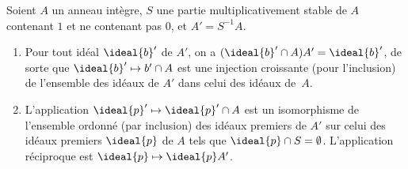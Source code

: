 \documentclass[11pt, %
  title in boldface,
  theorem in new line,
  theorem numbering = section,
  number theorems separately,
  simple name,
]{beaulivre}
\begin{document}
    \begin{proposition}\label{prop:localisation;correspondant}
        Soient \( A \) un anneau intègre, \( S \) une partie multiplicativement stable de \( A \) contenant \( 1 \) et ne contenant pas \( 0 \), et \( A' = S^{-1} A \).
        \begin{enumerate}
            \item \label{prop:localisation;correspondant;item1} Pour tout idéal \( \ideal{b}' \) de \( A' \), on a \( (\ideal{b}' \cap A) A' = \ideal{b}' \), de sorte que \( \ideal{b}' \mapsto {b}' \cap A \) est une injection croissante (pour l'inclusion) de l'ensemble des idéaux de \( A' \) dans celui des idéaux de~\( A \).
            \item \label{prop:localisation;correspondant;item2} L'application \( \ideal{p}' \mapsto \ideal{p}' \cap A \) est un isomorphisme de l'ensemble ordonné (par inclusion) des idéaux premiers de \( A' \) sur celui des idéaux premiers \( \ideal{p} \) de \( A \) tels que \( \ideal{p} \cap S = \emptyset \). L'application réciproque est \( \ideal{p} \mapsto \ideal{p}A' \).
        \end{enumerate}
    \end{proposition}
\end{document}
